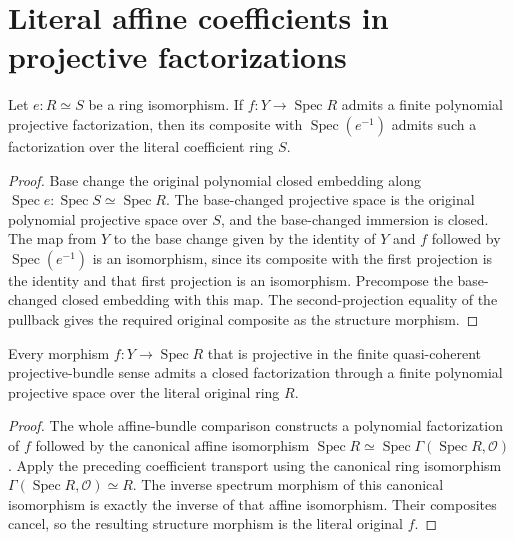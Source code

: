 \section{Literal affine coefficients in projective factorizations}

\begin{lemma}
\label{lem:fc-projective-factorization-ring-isomorphism}
\leanok
{}
Let $e:R\simeq S$ be a ring isomorphism.  If $f:Y\to\operatorname{Spec}R$
admits a finite polynomial projective factorization, then its composite
with $\operatorname{Spec}(e^{-1})$ admits such a factorization over the
literal coefficient ring $S$.
\end{lemma}
\begin{proof}
Base change the original polynomial closed embedding along
$\operatorname{Spec}e:\operatorname{Spec}S\simeq\operatorname{Spec}R$.
The base-changed projective space is the original polynomial
projective space over $S$, and the base-changed immersion is closed.
The map from $Y$ to the base change given by the identity of $Y$ and
$f$ followed by $\operatorname{Spec}(e^{-1})$ is an isomorphism, since
its composite with the first projection is the identity and that
first projection is an isomorphism.  Precompose the base-changed
closed embedding with this map.  The second-projection equality of
the pullback gives the required original composite as the structure
morphism.
\end{proof}

\begin{theorem}
\label{thm:fc-affine-projectivity-polynomial-factorization}
\leanok
{}
Every morphism $f:Y\to\operatorname{Spec}R$ that is projective in the
finite quasi-coherent projective-bundle sense admits a closed
factorization through a finite polynomial projective space over the
literal original ring $R$.
\end{theorem}
\begin{proof}
The whole affine-bundle comparison constructs a polynomial
factorization of $f$ followed by the canonical affine isomorphism
$\operatorname{Spec}R\simeq\operatorname{Spec}\Gamma(\operatorname{Spec}R,
\mathcal O)$.  Apply the preceding coefficient transport using the
canonical ring isomorphism
$\Gamma(\operatorname{Spec}R,\mathcal O)\simeq R$.  The inverse
spectrum morphism of this canonical isomorphism is exactly the
inverse of that affine isomorphism.  Their composites cancel, so the
resulting structure morphism is the literal original $f$.
\end{proof}
